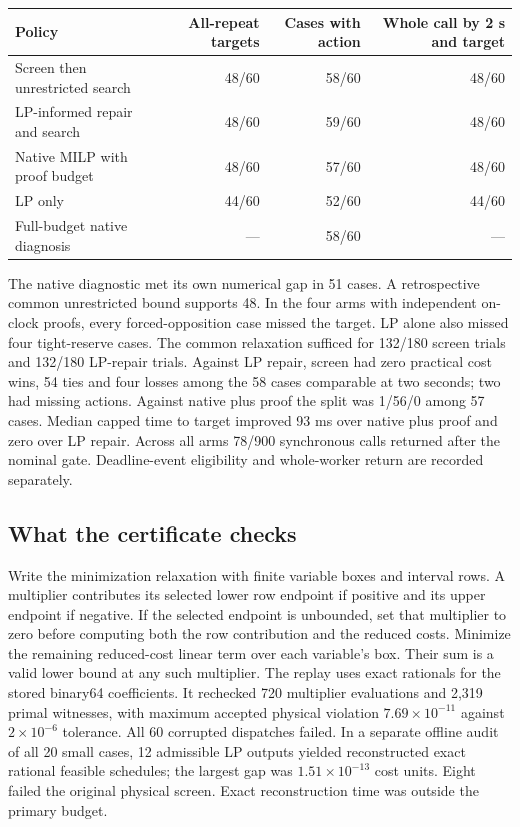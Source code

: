\documentclass[10pt,letterpaper]{article}
\newcommand{\sub}[1]{\subsection*{\color{green}#1}}
\begin{document}
\begin{center}\small
\begin{tabular}{@{}lrrr@{}}
\toprule
Policy & All-repeat targets & Cases with action & Whole call by 2 s and target\\\midrule
Screen then unrestricted search &48/60&58/60&48/60\\
LP-informed repair and search &48/60&59/60&48/60\\
Native MILP with proof budget &48/60&57/60&48/60\\
LP only &44/60&52/60&44/60\\
Full-budget native diagnosis & --- &58/60&---\\\bottomrule
\end{tabular}
\end{center}
The native diagnostic met its own numerical gap in 51 cases. A retrospective common unrestricted bound supports 48. In the four arms with independent on-clock proofs, every forced-opposition case missed the target. LP alone also missed four tight-reserve cases. The common relaxation sufficed for 132/180 screen trials and 132/180 LP-repair trials. Against LP repair, screen had zero practical cost wins, 54 ties and four losses among the 58 cases comparable at two seconds; two had missing actions. Against native plus proof the split was 1/56/0 among 57 cases. Median capped time to target improved 93 ms over native plus proof and zero over LP repair. Across all arms 78/900 synchronous calls returned after the nominal gate. Deadline-event eligibility and whole-worker return are recorded separately.

\sub{What the certificate checks}
Write the minimization relaxation with finite variable boxes and interval rows. A multiplier contributes its selected lower row endpoint if positive and its upper endpoint if negative. If the selected endpoint is unbounded, set that multiplier to zero before computing both the row contribution and the reduced costs. Minimize the remaining reduced-cost linear term over each variable's box. Their sum is a valid lower bound at any such multiplier. The replay uses exact rationals for the stored binary64 coefficients. It rechecked 720 multiplier evaluations and 2,319 primal witnesses, with maximum accepted physical violation $7.69\times10^{-11}$ against $2\times10^{-6}$ tolerance. All 60 corrupted dispatches failed. In a separate offline audit of all 20 small cases, 12 admissible LP outputs yielded reconstructed exact rational feasible schedules; the largest gap was $1.51\times10^{-13}$ cost units. Eight failed the original physical screen. Exact reconstruction time was outside the primary budget.
\end{document}
